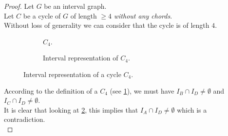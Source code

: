 \documentclass{article}
\begin{document}
\begin{proof}
    Let $G$ be an interval graph. \\
    Let $C$ be a cycle of $G$ of length $\geq 4$ \emph{without any chords}. \\
    Without loss of generality we can consider that the cycle is of length $4$.

    \bigskip

    \begin{figure}[h]
        \centering
        \begin{subfigure}[t]{0.45\textwidth}
            \centering
            \caption{$C_4$.}
            \label{fig:diamond_graph}
        \end{subfigure}
        \hfill
        \begin{subfigure}[t]{0.45\textwidth}
            \centering
            \caption{Interval representation of $C_4$.}
            \label{fig:interval_representation}
        \end{subfigure}
        \caption{Interval representation of a cycle $C_4$.}
        \label{fig:side_by_side}
    \end{figure}

    According to the definition of a $C_4$ (see \cref{fig:diamond_graph}),
    we must have $I_B \cap I_D \neq \emptyset$ and $I_C \cap I_D \neq \emptyset$. \\
    It is clear that looking at \cref{fig:interval_representation}, this implies
    that $I_A \cap I_D \neq \emptyset$ which is a contradiction. \\

\end{proof}
\end{document}
